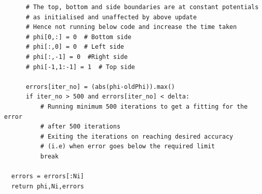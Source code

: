 \documentclass[11pt, a4paper]{article}
\begin{document}
\begin{verbatim}
      # The top, bottom and side boundaries are at constant potentials
      # as initialised and unaffected by above update
      # Hence not running below code and increase the time taken
      # phi[0,:] = 0  # Bottom side
      # phi[:,0] = 0  # Left side
      # phi[:,-1] = 0  #Right side
      # phi[-1,1:-1] = 1  # Top side
      
      errors[iter_no] = (abs(phi-oldPhi)).max()
      if iter_no > 500 and errors[iter_no] < delta:
          # Running minimum 500 iterations to get a fitting for the error
          # after 500 iterations
          # Exiting the iterations on reaching desired accuracy
          # (i.e) when error goes below the required limit
          break
  
  errors = errors[:Ni]
  return phi,Ni,errors
\end{verbatim}
\label{lst:laplace_solver}
\end{document}

